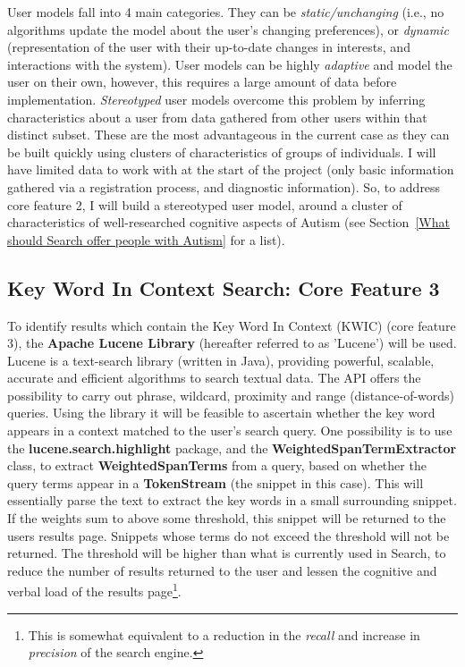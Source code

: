 \documentclass[a4paper, 10pt]{article}
\begin{document}
User models fall into 4 main categories. They can be \textit{static/unchanging} (i.e., no algorithms update the model about the user's changing preferences), or \textit{dynamic} (representation of the user with their up-to-date changes in interests, and interactions with the system). User models can be highly \textit{adaptive} and model the user on their own, however, this requires a large amount of data before implementation. \textit{Stereotyped} user models overcome this problem by inferring characteristics about a user from data gathered from other users within that distinct subset. These are the most advantageous in the current case as they can be built quickly using clusters of characteristics of groups of individuals. I will have limited data to work with at the start of the project (only basic information gathered via a registration process, and diagnostic information). So, to address core feature 2, I will build a stereotyped user model, around a cluster of characteristics of well-researched cognitive aspects of Autism (see Section~\ref{What should Search offer people with Autism} for a list).

\subsection{Key Word In Context Search: Core Feature 3}\label{apache}
To identify results which contain the Key Word In Context (KWIC)\cite{kwic} (core feature 3), the \textbf{Apache Lucene Library} (hereafter referred to as 'Lucene') will be used. Lucene is a text-search library (written in Java), providing powerful, scalable, accurate and efficient algorithms to search textual data. The API offers the possibility to carry out phrase, wildcard, proximity and range (distance-of-words) queries. Using the library it will be feasible to ascertain whether the key word appears in a context matched to the user's search query. One possibility is to use the \textbf{lucene.search.highlight} package, and the \textbf{WeightedSpanTermExtractor} class, to extract \textbf{WeightedSpanTerms} from a query, based on whether the query terms appear in a \textbf{TokenStream} (the snippet in this case). This will essentially parse the text to extract the key words in a small surrounding snippet. If the weights sum to above some threshold, this snippet will be returned to the users results page. Snippets whose terms do not exceed the threshold will not be returned. The threshold will be higher than what is currently used in Search, to reduce the number of results returned to the user and lessen the cognitive and verbal load of the results page\footnote{This is somewhat equivalent to a reduction in the \textit{recall} and increase in \textit{precision} of the search engine.}.
\end{document}
